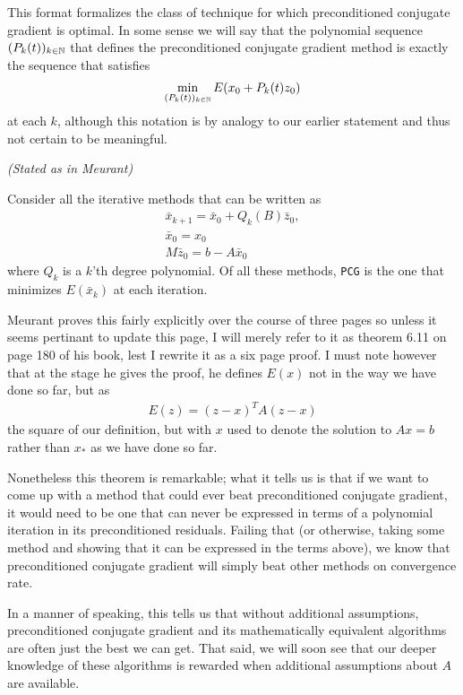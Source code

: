 \documentclass[11pt]{article}
\begin{document}
This format formalizes the class of technique for which preconditioned conjugate gradient is optimal. In some sense we will say that the polynomial sequence $(P_k(t))_{k \in \mathbb{N}}$ that defines the preconditioned conjugate gradient method is exactly the sequence that satisfies \begin{gather*}
\min_{(P_k(t))_{k \in \mathbb{N}}} E(x_0 + P_k(t) z_0)
\end{gather*}
at each $k$, although this notation is by analogy to our earlier statement and thus not certain to be meaningful.

\begin{theorem}
\emph{(Stated as in Meurant)}

Consider all the iterative methods that can be written as \begin{gather*}
\bar x_{k+1} = \bar x_0 + Q_k(B) \bar z_0,\\
\bar x_0 = x_0 \\
M \bar z_0 = b - A \bar x_0
\end{gather*}
where $Q_k$ is a $k$'th degree polynomial. Of all these methods, \texttt{PCG} is the one that minimizes $E(\bar x_k)$ at each iteration.
\end{theorem}

Meurant proves this fairly explicitly over the course of three pages so unless it seems pertinant to update this page, I will merely refer to it as theorem 6.11 on page 180 of his book, lest I rewrite it as a six page proof. I must note however that at the stage he gives the proof, he defines $E(x)$ not in the way we have done so far, but as \begin{gather*}
E(z) = (z - x)^T A (z - x) 	 
\end{gather*}
the square of our definition, but with $x$ used to denote the solution to $Ax = b$ rather than $x_*$ as we have done so far.

Nonetheless this theorem is remarkable; what it tells us is that if we want to come up with a method that could ever beat preconditioned conjugate gradient, it would need to be one that can never be expressed in terms of a polynomial iteration in its preconditioned residuals. Failing that (or otherwise, taking some method and showing that it can be expressed in the terms above), we know that preconditioned conjugate gradient will simply beat other methods on convergence rate.

In a manner of speaking, this tells us that without additional assumptions, preconditioned conjugate gradient and its mathematically equivalent algorithms are often just the best we can get. That said, we will soon see that our deeper knowledge of these algorithms is rewarded when additional assumptions about $A$ are available.
\end{document}
